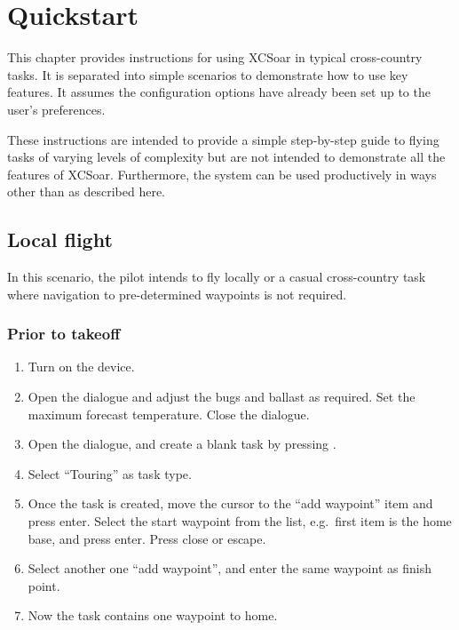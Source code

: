 \chapter{Quickstart}\label{cha:quickstart}

This chapter provides instructions for using XCSoar in typical
cross-country tasks.  It is separated into simple scenarios to
demonstrate how to use key features.  It assumes the configuration
options have already been set up to the user's preferences.

These instructions are intended to provide a simple step-by-step guide
to flying tasks of varying levels of complexity but are not intended
to demonstrate all the features of XCSoar.  Furthermore, the system
can be used productively in ways other than as described here.

\section{Local flight}\label{sec:local-flight}

In this scenario, the pilot intends to fly locally or a casual
cross-country task where navigation to pre-determined waypoints is not
required.

\subsection*{Prior to takeoff}
\begin{enumerate}
\item  Turn on the device.
\item  Open the  dialogue and adjust the bugs and ballast as
  required. Set the maximum forecast temperature.  Close the dialogue.
\item  Open the  dialogue, and create a blank task by pressing
.
\item  Select ``Touring'' as  task type. %
\item  Once the task is created, move the cursor to the ``add waypoint'' item
  and press enter.  Select the start waypoint from the list, e.g.\ first item is
  the home base, and press enter.
  Press close or escape.
\item Select another one ``add waypoint'', and enter the same waypoint as finish
  point.
\item  Now the task contains one waypoint to home.
\end{enumerate}

